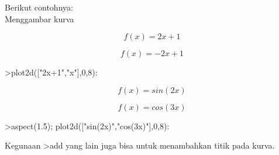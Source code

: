 \documentclass[a4paper,10pt]{article}
\begin{document}
\begin{eulernotebook}
\begin{eulercomment}
\begin{eulercomment}
\begin{eulercomment}
\begin{eulercomment}
\begin{eulercomment}
\begin{eulercomment}
\begin{eulercomment}
Berikut contohnya:\\
Menggambar kurva\\
\end{eulercomment}
\begin{eulerformula}
\[
f(x)= 2x+1
\]
\end{eulerformula}
\begin{eulerformula}
\[
f(x)= -2x+1
\]
\end{eulerformula}
\begin{eulerprompt}
>plot2d(["2x+1","x"],0,8):
\end{eulerprompt}
\begin{eulerformula}
\[
f(x)=sin(2x)
\]
\end{eulerformula}
\begin{eulerformula}
\[
f(x)=cos(3x)
\]
\end{eulerformula}
\begin{eulerprompt}
>aspect(1.5); plot2d(["sin(2x)","cos(3x)"],0,8):
\end{eulerprompt}
\begin{eulercomment}
Kegunaan \textgreater{}add yang lain juga bisa untuk menambahkan titik pada kurva.


\end{eulercomment}
\end{eulercomment}
\end{eulercomment}
\end{eulercomment}
\end{eulercomment}
\end{eulercomment}
\end{eulercomment}
\end{eulernotebook}
\end{document}
